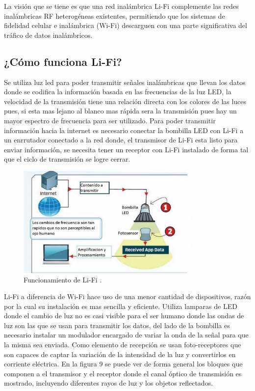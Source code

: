 \documentclass[10pt,journal,compsoc]{IEEEtran}
\begin{document}
La visión que se tiene es que una red inalámbrica Li-Fi complemente las redes inalámbricas RF heterogéneas existentes, permitiendo que los sistemas de fidelidad celular e inalámbrica (Wi-Fi) descarguen con  una parte significativa del tráfico de datos inalámbricos.

\subsection{¿Cómo funciona Li-Fi?}

Se utiliza luz led para poder transmitir señales inalámbricas que llevan los datos donde se codifica la información basada en las frecuencias de la luz LED, la velocidad de la transmisión tiene una relación directa con los colores de las luces pues, si esta mas lejano al blanco mas rápida sera la transmisión pues hay un mayor espectro de frecuencia para ser utilizado. Para poder transmitir información hacia la internet es necesario conectar la bombilla LED con Li-Fi a un enrrutador conectado a la red donde, el transmisor de Li-Fi esta listo para enviar información, se necesita tener un receptor con Li-Fi instalado de forma tal que el ciclo de transmisión se logre cerrar. 

\begin{figure}[h]
    \centering
    \includegraphics[width=9cm]{lifi1}
    \caption{Funcionamiento de Li-Fi \cite{aravena}.}
    \label{fig:base-station}
\end{figure}


Li-Fi a diferencia de Wi-Fi hace uso de una menor cantidad de dispositivos, razón por la cual su instalación es mas sencilla y eficiente. Utiliza lamparas de LED donde el cambio de luz no es casi visible para el ser humano donde las ondas de luz son las que se usan para transmitir los datos, del lado de la bombilla es necesario instalar un modulador encargado de variar la onda de la señal para que la misma sea enviada. Como elemento de recepción se usan foto-receptores que son capaces de captar la variación de la intensidad de la luz y convertirlos en corriente eléctrica. En la figura 9 se puede ver de forma general los bloques que componen a el transmisor y el receptor donde el canal óptico de transmisión es mostrado, incluyendo diferentes rayos de luz y los objetos reflectados.
\end{document}

